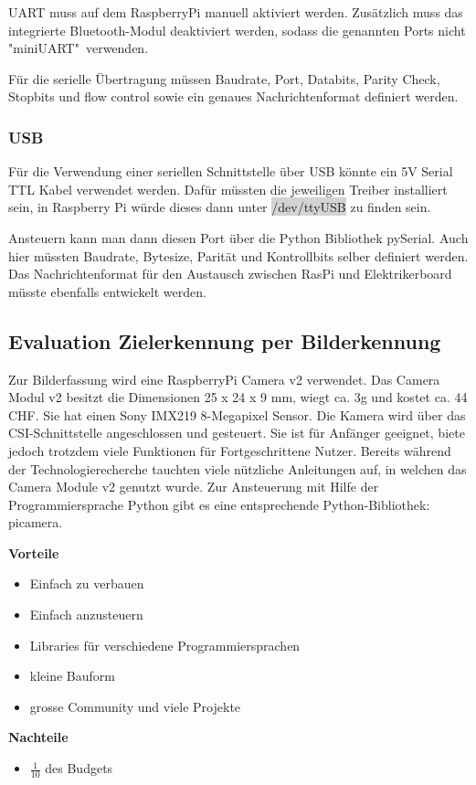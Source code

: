 \documentclass[a4paper]{report}
\begin{document}
UART muss auf dem RaspberryPi manuell aktiviert werden.  Zusätzlich muss das integrierte Bluetooth-Modul deaktiviert werden, sodass die genannten Ports nicht "miniUART"\ verwenden.

Für die serielle Übertragung müssen Baudrate, Port, Databits, Parity Check, Stopbits und flow control sowie ein genaues Nachrichtenformat definiert werden.

\subsubsection{USB}
\label{app:ssec:EvalUSB}
Für die Verwendung einer seriellen Schnittstelle über USB könnte ein 5V Serial TTL Kabel verwendet werden. Dafür müssten die jeweiligen Treiber installiert sein, in Raspberry Pi würde dieses dann unter \colorbox{lightgrey}{/dev/ttyUSB} zu finden sein.

Ansteuern kann man dann diesen Port über die Python Bibliothek pySerial. \parencite{Liechti2017} Auch hier müssten Baudrate, Bytesize, Parität und Kontrollbits selber definiert werden. Das Nachrichtenformat für den Austausch zwischen RasPi und Elektrikerboard müsste ebenfalls entwickelt werden.

\subsection{Evaluation Zielerkennung per Bilderkennung}
\label{app:ssec:EvalZielErkBild}
Zur Bilderfassung wird eine RaspberryPi Camera v2 verwendet. Das Camera Modul v2 besitzt die Dimensionen 25 x 24 x 9 mm, wiegt ca. 3g und kostet ca. 44 CHF.
Sie hat einen Sony IMX219 8-Megapixel Sensor. Die Kamera wird über das CSI-Schnittstelle angeschlossen und gesteuert. Sie ist für Anfänger geeignet, biete jedoch trotzdem viele Funktionen für Fortgeschrittene Nutzer.
Bereits während der Technologierecherche tauchten viele nützliche Anleitungen auf, in welchen das Camera Module v2 genutzt wurde.
Zur Ansteuerung mit Hilfe der Programmiersprache Python gibt es eine entsprechende Python-Bibliothek: picamera.

\begin{multicols}{2}
	\textbf{Vorteile}
	\begin{itemize}[label={+},noitemsep]
		\item Einfach zu verbauen
		\item Einfach anzusteuern
		\item Libraries für verschiedene Programmiersprachen
		\item kleine Bauform
		\item grosse Community und viele Projekte
	\end{itemize}
	\columnbreak
	\textbf{Nachteile}
	\begin{itemize}[label={-},noitemsep]
		\item $\frac{1}{10}$ des Budgets
	\end{itemize}
\end{multicols}
\end{document}
